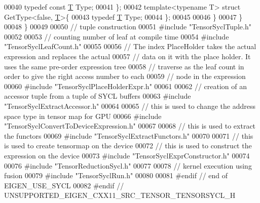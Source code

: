 \begin{DoxyCode}
00040   \textcolor{keyword}{typedef} \textcolor{keyword}{const} \hyperlink{group___sparse_core___module_class_eigen_1_1_triplet}{T} Type;
00041 \};
00042 \textcolor{keyword}{template}<\textcolor{keyword}{typename} T> \textcolor{keyword}{struct }GetType<false, \hyperlink{group___sparse_core___module_class_eigen_1_1_triplet}{T}>\{
00043   \textcolor{keyword}{typedef} \hyperlink{group___sparse_core___module_class_eigen_1_1_triplet}{T} Type;
00044 \};
00045 
00046 \}
00047 \}
00048 \}
00049 
00050 \textcolor{comment}{// tuple construction}
00051 \textcolor{preprocessor}{#include "TensorSyclTuple.h"}
00052 
00053 \textcolor{comment}{// counting number of leaf at compile time}
00054 \textcolor{preprocessor}{#include "TensorSyclLeafCount.h"}
00055 
00056 \textcolor{comment}{// The index PlaceHolder takes the actual expression and replaces the actual}
00057 \textcolor{comment}{// data on it with the place holder. It uses the same pre-order expression tree}
00058 \textcolor{comment}{// traverse as the leaf count in order to give the right access number to each}
00059 \textcolor{comment}{// node in the expression}
00060 \textcolor{preprocessor}{#include "TensorSyclPlaceHolderExpr.h"}
00061 
00062 \textcolor{comment}{// creation of an accessor tuple from a tuple of SYCL buffers}
00063 \textcolor{preprocessor}{#include "TensorSyclExtractAccessor.h"}
00064 
00065 \textcolor{comment}{// this is used to change the address space type in tensor map for GPU}
00066 \textcolor{preprocessor}{#include "TensorSyclConvertToDeviceExpression.h"}
00067 
00068 \textcolor{comment}{// this is used to extract the functors}
00069 \textcolor{preprocessor}{#include "TensorSyclExtractFunctors.h"}
00070 
00071 \textcolor{comment}{// this is used to create tensormap on the device}
00072 \textcolor{comment}{// this is used to construct the expression on the device}
00073 \textcolor{preprocessor}{#include "TensorSyclExprConstructor.h"}
00074 
00076 \textcolor{preprocessor}{#include "TensorReductionSycl.h"}
00077 
00078 \textcolor{comment}{// kernel execution using fusion}
00079 \textcolor{preprocessor}{#include "TensorSyclRun.h"}
00080 
00081 \textcolor{preprocessor}{#endif  // end of EIGEN\_USE\_SYCL}
00082 \textcolor{preprocessor}{#endif  // UNSUPPORTED\_EIGEN\_CXX11\_SRC\_TENSOR\_TENSORSYCL\_H}
\end{DoxyCode}
